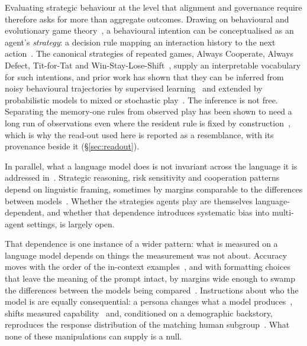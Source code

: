 \documentclass[11pt,a4paper]{article}
\begin{document}
Evaluating strategic behaviour at the level that alignment and governance
require therefore asks for more than aggregate outcomes. Drawing on
behavioural and evolutionary game theory~\cite{sigmund:2010bo}, a behavioural
intention can be conceptualised as an agent's \emph{strategy}: a decision rule
mapping an interaction history to the next
action~\cite{han2011role,diStefanoIntention2023,Han2012ALIFEjournal,fujimoto2019functional}.
The canonical strategies of repeated games, Always Cooperate, Always Defect,
Tit-for-Tat and Win-Stay-Lose-Shift~\cite{Axelrod1980Effective,sigmund:2010bo},
supply an interpretable vocabulary for such intentions, and prior work has
shown that they can be inferred from noisy behavioural trajectories by
supervised learning~\cite{han2011role,diStefanoIntention2023} and extended by
probabilistic models to mixed or stochastic play~\cite{inferenceStrategies}.
The inference is not free. Separating the memory-one rules from observed play
has been shown to need a long run of observations even where the resident rule
is fixed by construction~\cite{kim2021win,hilbe2013memory}, which is why the
read-out used here is reported as a resemblance, with its provenance beside it
(\S\ref{sec:readout}).

In parallel, what a language model does is not invariant across the language
it is addressed in~\cite{buscemi2025fairgame}. Strategic reasoning, risk
sensitivity and cooperation patterns depend on linguistic framing, sometimes by
margins comparable to the differences between
models~\cite{loreheydari2024strategic,buscemi2025llms,buscemi2025strategic}.
Whether the strategies agents play are themselves language-dependent, and
whether that dependence introduces systematic bias into multi-agent settings,
is largely open.

That dependence is one instance of a wider pattern: what is measured on a
language model depends on things the measurement was not about. Accuracy moves
with the order of the in-context examples~\cite{lu2022fantastically}, and with
formatting choices that leave the meaning of the prompt intact, by margins wide
enough to swamp the differences between the models being
compared~\cite{sclar2024quantifying}. Instructions about who the model is are
equally consequential: a persona changes what a model
produces~\cite{deshpande2023toxicity}, shifts measured
capability~\cite{salewski2023context} and, conditioned on a demographic
backstory, reproduces the response distribution of the matching human
subgroup~\cite{argyle2023out}. What none of these manipulations can supply is a
null.
\end{document}
